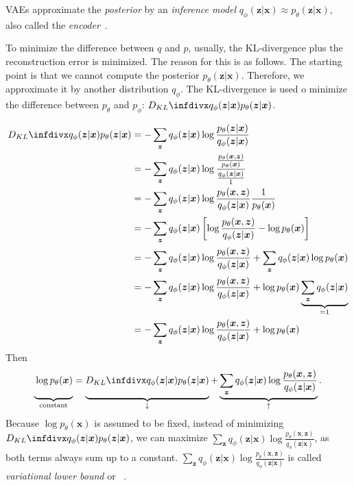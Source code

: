 \acp{VAE} approximate the \textit{posterior} by an \textit{inference model} $q_\phi(\bm{z}|\bm{x}) \approx p_\theta(\bm{z}|\bm{x})$, also called the \textit{encoder}~\citep[p. 15]{kingma2019introduction}.

To minimize the difference between $q$ and $p$, usually, the \ac{KL-divergence} plus the reconstruction error is minimized.
The reason for this is as follows.
The starting point is that we cannot compute the posterior $p_\theta(\bm{z}|\bm{x})$.
Therefore, we approximate it by another distribution $q_\phi$.
The \ac{KL-divergence} is used o minimize the difference between $p_{\theta}$ and $p_{\phi}$: $\kldiv{q_\phi(\bm{z}|\bm{x})}{p_\theta(\bm{z}|\bm{x})}$.

\begin{align}
    \kldiv{q_\phi(\bm{z}|\bm{x})}{p_\theta(\bm{z}|\bm{x})} &= -\sum_{\bm{z}} q_\phi(\bm{z}|\bm{x}) \log \frac{p_\theta(\bm{z}|\bm{x})}{q_\phi(\bm{z}|\bm{x})} \\
    &= -\sum_{\bm{z}} q_\phi(\bm{z}|\bm{x}) \log \frac{\frac{p_\theta(\bm{x},\bm{z})}{p_\theta(\bm{x})}}{\frac{q_\phi(\bm{z}|\bm{x})}{1}}\\
    &= -\sum_{\bm{z}} q_\phi(\bm{z}|\bm{x}) \log \frac{p_\theta(\bm{x},\bm{z})}{q_\phi(\bm{z}|\bm{x})}\frac{1}{p_\theta(\bm{x})}\\
    &= -\sum_{\bm{z}} q_\phi(\bm{z}|\bm{x}) \left[ \log \frac{p_\theta(\bm{x},\bm{z})}{q_\phi(\bm{z}|\bm{x})} - \log p_\theta(\bm{x}) \right]\\
    &= -\sum_{\bm{z}} q_\phi(\bm{z}|\bm{x}) \log \frac{p_\theta(\bm{x},\bm{z})}{q_\phi(\bm{z}|\bm{x})} + \sum_{\bm{z}} q_\phi(\bm{z}|\bm{x}) \log p_\theta(\bm{x}) \\
    &= -\sum_{\bm{z}} q_\phi(\bm{z}|\bm{x}) \log \frac{p_\theta(\bm{x},\bm{z})}{q_\phi(\bm{z}|\bm{x})} + \log p_\theta(\bm{x}) \underbrace{\sum_{\bm{z}} q_\phi(\bm{z}|\bm{x})}_{=1} \\
    &= -\sum_{\bm{z}} q_\phi(\bm{z}|\bm{x}) \log \frac{p_\theta(\bm{x},\bm{z})}{q_\phi(\bm{z}|\bm{x})} + \log p_\theta(\bm{x})
\end{align}
Then
\begin{align}
    \underbrace{\vphantom{\sum_{\bm{z}} x}\log p_\theta(\bm{x})}_{\text{constant}} =  \underbrace{\vphantom{\sum_{\bm{z}} x}\kldiv{q_\phi(\bm{z}|\bm{x})}{p_\theta(\bm{z}|\bm{x})}}_{\downarrow}  + \underbrace{\sum_{\bm{z}} q_\phi(\bm{z}|\bm{x}) \log \frac{p_\theta(\bm{x},\bm{z})}{q_\phi(\bm{z}|\bm{x})}}_{\uparrow}.
\end{align}
Because $\log p_\theta(\bm{x})$ is assumed to be fixed, instead of minimizing $\kldiv{q_\phi(\bm{z}|\bm{x})}{p_\theta(\bm{z}|\bm{x})}$, we can maximize $\sum_{\bm{z}} q_\phi(\bm{z}|\bm{x}) \log \frac{p_\theta(\bm{x},\bm{z})}{q_\phi(\bm{z}|\bm{x})}$, as both terms always sum up to a constant.
$\sum_{\bm{z}} q_\phi(\bm{z}|\bm{x}) \log \frac{p_\theta(\bm{x},\bm{z})}{q_\phi(\bm{z}|\bm{x})}$ is called \textit{variational lower bound} or ~\citep[p. 18]{kingma2019introduction}.

